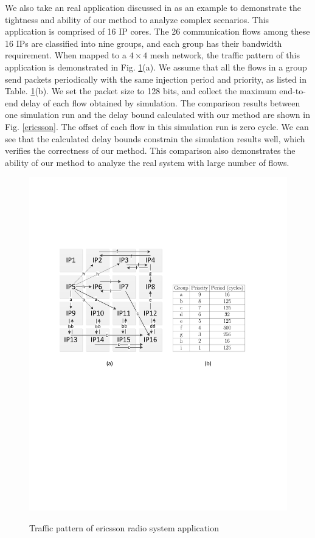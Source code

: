 \documentclass[preprint]{elsarticle}
\begin{document}
We also take an real application discussed in \cite{LuJa08}\cite{Jafari1922089} as an example to demonstrate the tightness and ability of our method to analyze complex scenarios. This application is comprised of 16 IP cores. The 26 communication flows among these 16 IPs are classified into nine groups, and each group has their bandwidth requirement. When mapped to a $4\times 4$ mesh network, the traffic pattern of this application is demonstrated in Fig. \ref{trafficpattern}(a). We assume that all the flows in a group send packets periodically with the same injection period and priority, as listed in Table. \ref{trafficpattern}(b). We set the packet size to 128 bits, and collect the maximum end-to-end delay of each flow obtained by simulation. The comparison results between one simulation run and the delay bound calculated  with our method are shown in Fig. \ref{ericsson}. The offset of each flow in this simulation run is zero cycle. We can see that the calculated delay bounds constrain the simulation results well, which verifies the correctness of our method. This comparison also demonstrates the ability of our method to analyze the real system with large number of flows.
\begin{figure}
  \centering
  \includegraphics[scale=0.7]{figures/trafficpattern.pdf}\\
  \caption{Traffic pattern of ericsson radio system application}\label{trafficpattern}
\end{figure}
\end{document}
